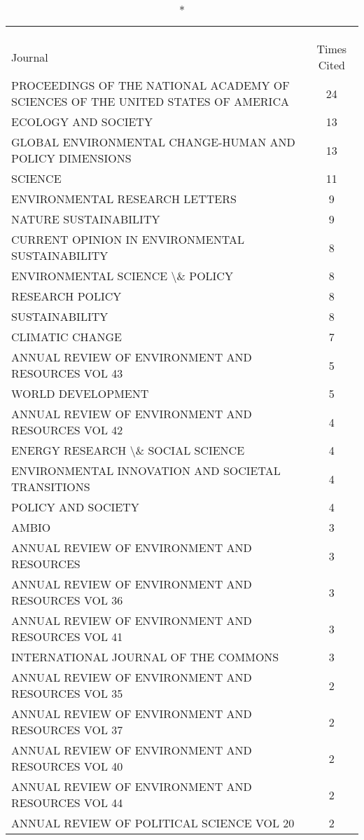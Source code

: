 \documentclass[]{article}
\begin{document}
\begin{longtable}{lc}
\caption*{
\large Most Cited Journals\textsuperscript{1}\\ 
\small \textsuperscript{}\\ 
} \\ 
\toprule
Journal & Times Cited \\ 
\midrule
PROCEEDINGS OF THE NATIONAL ACADEMY OF SCIENCES OF THE UNITED STATES OF AMERICA & 24 \\ 
ECOLOGY AND SOCIETY & 13 \\ 
GLOBAL ENVIRONMENTAL CHANGE-HUMAN AND POLICY DIMENSIONS & 13 \\ 
SCIENCE & 11 \\ 
ENVIRONMENTAL RESEARCH LETTERS & 9 \\ 
NATURE SUSTAINABILITY & 9 \\ 
CURRENT OPINION IN ENVIRONMENTAL SUSTAINABILITY & 8 \\ 
ENVIRONMENTAL SCIENCE \textbackslash \& POLICY & 8 \\ 
RESEARCH POLICY & 8 \\ 
SUSTAINABILITY & 8 \\ 
CLIMATIC CHANGE & 7 \\ 
ANNUAL REVIEW OF ENVIRONMENT AND RESOURCES VOL 43 & 5 \\ 
WORLD DEVELOPMENT & 5 \\ 
ANNUAL REVIEW OF ENVIRONMENT AND RESOURCES VOL 42 & 4 \\ 
ENERGY RESEARCH \textbackslash \& SOCIAL SCIENCE & 4 \\ 
ENVIRONMENTAL INNOVATION AND SOCIETAL TRANSITIONS & 4 \\ 
POLICY AND SOCIETY & 4 \\ 
AMBIO & 3 \\ 
ANNUAL REVIEW OF ENVIRONMENT AND RESOURCES & 3 \\ 
ANNUAL REVIEW OF ENVIRONMENT AND RESOURCES VOL 36 & 3 \\ 
ANNUAL REVIEW OF ENVIRONMENT AND RESOURCES VOL 41 & 3 \\ 
INTERNATIONAL JOURNAL OF THE COMMONS & 3 \\ 
ANNUAL REVIEW OF ENVIRONMENT AND RESOURCES VOL 35 & 2 \\ 
ANNUAL REVIEW OF ENVIRONMENT AND RESOURCES VOL 37 & 2 \\ 
ANNUAL REVIEW OF ENVIRONMENT AND RESOURCES VOL 40 & 2 \\ 
ANNUAL REVIEW OF ENVIRONMENT AND RESOURCES VOL 44 & 2 \\ 
ANNUAL REVIEW OF POLITICAL SCIENCE VOL 20 & 2 \\ 

\end{longtable}
\end{document}
